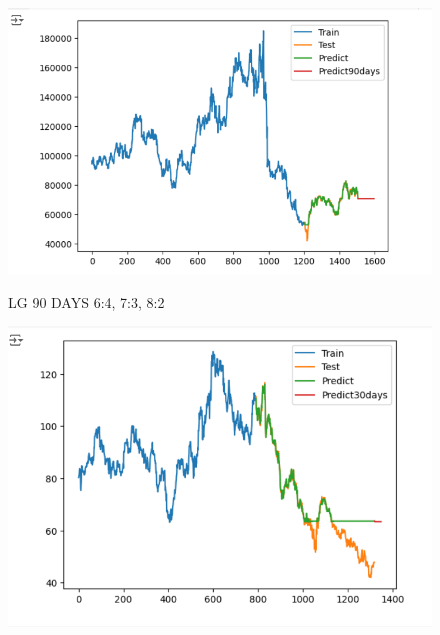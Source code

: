 \documentclass{article}
\begin{document}
\begin{multicols}{2}
\begin{figure}[H]
\begin{minipage}{0.15\textwidth}
    \label{fig:2}
    \end{minipage}%
    \begin{minipage}{0.15\textwidth}
    \centering
    \includegraphics[width=1\textwidth]{Image/GradientBoosting/LG_90_8_2_GradientBoostingRegressor.png}

    \label{fig:3}
    \end{minipage}
    \caption{LG 90 DAYS  6:4, 7:3, 8:2 }
\end{figure}

\begin{figure}[H]
    \centering
    \begin{minipage}{0.15\textwidth}
    \centering
    \includegraphics[width=1\textwidth]{Image/GradientBoosting/SONY_30_6_4_GradientBoostingRegressor.png}
   

\end{minipage}
\end{figure}
\end{multicols}
\end{document}
